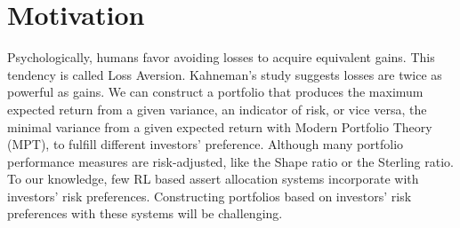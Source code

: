 \section {Motivation}
Psychologically, humans favor avoiding losses to acquire equivalent gains. This tendency is called Loss Aversion.\cite{kahneman2000analysis} Kahneman's study suggests losses are twice as powerful as gains\cite{Tversky1992}.
We can construct a portfolio that produces the maximum expected return from a given variance, an indicator of risk, or vice versa, the minimal variance from a given expected return with Modern Portfolio Theory (MPT), \cite{10.2307/2975974} to fulfill different investors' preference.
Although many portfolio performance measures are risk-adjusted\cite{cogneau2009101}, like the Shape ratio\cite{Sharpe49} or the Sterling ratio\cite{magdon2004maximum}. To our knowledge, few RL based assert allocation systems incorporate with investors' risk preferences. Constructing portfolios based on investors' risk preferences with these systems will be challenging.